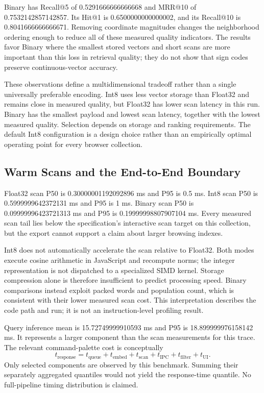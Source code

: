 \documentclass[conference]{IEEEtran}
\newcommand{\mQueryMean}{15.72749999910593}
\newcommand{\mQueryTail}{18.899999976158142}
\newcommand{\mFloatScanMedian}{0.30000001192092896}
\newcommand{\mFloatScanTail}{0.5}
\newcommand{\mIntScanMedian}{0.5999999642372131}
\newcommand{\mIntScanTail}{1}
\newcommand{\mBinaryScanMedian}{0.09999996423721313}
\newcommand{\mBinaryScanTail}{0.19999998807907104}
\newcommand{\mBinaryRecallFive}{0.5291666666666668}
\newcommand{\mBinaryRecallTen}{0.8041666666666671}
\newcommand{\mBinaryHitOne}{0.6500000000000002}
\newcommand{\mBinaryMRR}{0.7532142857142857}
\begin{document}
Binary has Recall@5 of \mBinaryRecallFive{} and MRR@10 of
\mBinaryMRR{}. Its Hit@1 is \mBinaryHitOne{}, and its Recall@10 is
\mBinaryRecallTen{}. Removing coordinate magnitudes changes the neighborhood
ordering enough to reduce all of these measured quality indicators. The
results favor Binary where the smallest stored vectors and short scans are
more important than this loss in retrieval quality; they do not show that
sign codes preserve continuous-vector accuracy.

These observations define a multidimensional tradeoff rather than a single
universally preferable encoding. Int8 uses less vector storage than Float32
and remains close in measured quality, but Float32 has lower scan latency in
this run. Binary has the smallest payload and lowest scan latency, together
with the lowest measured quality. Selection depends on storage and ranking
requirements. The default Int8 configuration is a design choice rather than
an empirically optimal operating point for every browser collection.

\subsection{Warm Scans and the End-to-End Boundary}
Float32 scan P50 is \mFloatScanMedian{} ms and P95 is
\mFloatScanTail{} ms. Int8 scan P50 is \mIntScanMedian{} ms and P95 is
\mIntScanTail{} ms. Binary scan P50 is \mBinaryScanMedian{} ms and P95 is
\mBinaryScanTail{} ms. Every measured scan tail lies below the specification's
interactive scan target on this collection, but the export cannot support a
claim about larger browsing indexes.

Int8 does not automatically accelerate the scan relative to Float32.
Both modes execute cosine arithmetic in JavaScript and recompute norms;
the integer representation is not dispatched to a specialized SIMD kernel.
Storage compression alone is therefore insufficient to predict processing
speed. Binary comparisons instead exploit packed words and population count,
which is consistent with their lower measured scan cost. This interpretation
describes the code path and run; it is not an instruction-level profiling
result.

Query inference mean is \mQueryMean{} ms and P95 is \mQueryTail{} ms.
It represents a larger component than the scan measurements for this trace.
The relevant command-palette cost is conceptually
\begin{equation}
 t_{\mathrm{response}} =
 t_{\mathrm{queue}}+t_{\mathrm{embed}}+t_{\mathrm{scan}}
 +t_{\mathrm{IPC}}+t_{\mathrm{filter}}+t_{\mathrm{UI}}.
 \label{eq:latency}
\end{equation}
Only selected components are observed by this benchmark. Summing their
separately aggregated quantiles would not yield the response-time quantile.
No full-pipeline timing distribution is claimed.
\end{document}

